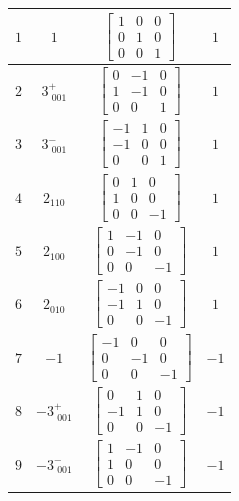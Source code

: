 \documentclass[fleqn,8pt]{jsarticle}
\begin{document}
\begin{longtable}{cccc}
$ 1 $ & $ 1 $ & $ \begin{bmatrix} 1 & 0 & 0 \\ 0 & 1 & 0 \\ 0 & 0 & 1 \end{bmatrix} $ & $ 1 $ \\ \hline
$ 2 $ & $ 3^{+}_{\,\,001} $ & $ \begin{bmatrix} 0 & -1 & 0 \\ 1 & -1 & 0 \\ 0 & 0 & 1 \end{bmatrix} $ & $ 1 $ \\ \hline
$ 3 $ & $ 3^{-}_{\,\,001} $ & $ \begin{bmatrix} -1 & 1 & 0 \\ -1 & 0 & 0 \\ 0 & 0 & 1 \end{bmatrix} $ & $ 1 $ \\ \hline
$ 4 $ & $ 2{}_{110} $ & $ \begin{bmatrix} 0 & 1 & 0 \\ 1 & 0 & 0 \\ 0 & 0 & -1 \end{bmatrix} $ & $ 1 $ \\ \hline
$ 5 $ & $ 2{}_{100} $ & $ \begin{bmatrix} 1 & -1 & 0 \\ 0 & -1 & 0 \\ 0 & 0 & -1 \end{bmatrix} $ & $ 1 $ \\ \hline
$ 6 $ & $ 2{}_{010} $ & $ \begin{bmatrix} -1 & 0 & 0 \\ -1 & 1 & 0 \\ 0 & 0 & -1 \end{bmatrix} $ & $ 1 $ \\ \hline
$ 7 $ & $ -1 $ & $ \begin{bmatrix} -1 & 0 & 0 \\ 0 & -1 & 0 \\ 0 & 0 & -1 \end{bmatrix} $ & $ -1 $ \\ \hline
$ 8 $ & $ -3^{+}_{\,\,001} $ & $ \begin{bmatrix} 0 & 1 & 0 \\ -1 & 1 & 0 \\ 0 & 0 & -1 \end{bmatrix} $ & $ -1 $ \\ \hline
$ 9 $ & $ -3^{-}_{\,\,001} $ & $ \begin{bmatrix} 1 & -1 & 0 \\ 1 & 0 & 0 \\ 0 & 0 & -1 \end{bmatrix} $ & $ -1 $ \\ \hline

\end{longtable}
\end{document}
